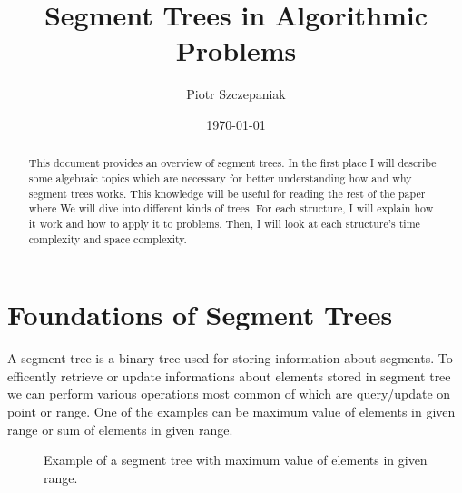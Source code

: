 \documentclass{article}
\title{Segment Trees in Algorithmic Problems}
\author{Piotr Szczepaniak}
\date{\today}
\begin{document}
\maketitle

\tableofcontents

\begin{abstract}
This document provides an overview of segment trees. In the first place
I will describe some algebraic topics which are necessary for better
understanding how and why segment trees works. This knowledge will be useful
for reading the rest of the paper where We will dive into different kinds of trees.
For each structure, I will explain how it work and how to apply it to problems.
Then, I will look at each structure's time complexity and space complexity.
\end{abstract}

\section{Foundations of Segment Trees}
A segment tree is a binary tree used for storing information about segments. 
To efficently retrieve or update informations about elements stored 
in segment tree we can perform various operations most common of which are
query/update on point or range.
One of the examples can be maximum value of 
elements in given range or sum of elements in given range.

\begin{figure}[H]
    \centering
    
    \caption{Example of a segment tree with maximum value of elements in given range.}
    \label{fig:segment_tree_1}
\end{figure}
\end{document}
